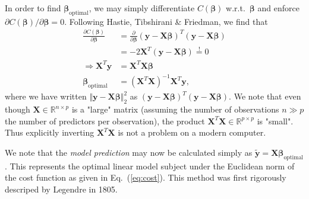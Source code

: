 \documentclass[a4paper, twocolumn]{article}
\newcommand{\eq} [1]{Eq.\ (\ref{eq:#1})}
\begin{document}
In order to find $\bm\beta_\text{optimal}$, we may simply differentiate $C(\bm\beta)$ w.r.t.\ $\bm\beta$ and enforce $\partial C(\bm\beta)/\partial \bm\beta = 0$. Following Hastie, Tibshirani \& Friedman\autocite{trevor2009elements}, we find that
\begin{align}
\frac{\partial C(\bm\beta)}{\partial \bm\beta} &= \frac{\partial}{\partial \bm\beta} (\mathbf{y}-\mathbf{X}\bm\beta)^T (\mathbf{y}-\mathbf{X}\bm\beta) \nonumber \\
%
&= -2\mathbf{X}^T(\mathbf{y}-\mathbf{X}\bm\beta) \stackrel{!}{=} 0 \nonumber \\
%
\Rightarrow \mathbf{X}^T\mathbf{y} &= \mathbf{X}^T\mathbf{X}\bm\beta \nonumber \\
%
\bm\beta_\text{optimal} &= \left(\mathbf{X}^T\mathbf{X}\right)^{-1}\mathbf{X}^T\mathbf{y},
\end{align}
where we have written $\Vert \mathbf{y}-\mathbf{X}\bm\beta\Vert_2^2$ as $(\mathbf{y}-\mathbf{X}\bm\beta)^T (\mathbf{y}-\mathbf{X}\bm\beta)$. We note that even though $\mathbf{X}\in \mathbb{R}^{n\times p}$ is a "large" matrix (assuming the number of observations $n\gg p$ the number of predictors per observation), the product $\mathbf{X}^T\mathbf{X}\in \mathbb{R}^{p\times p}$ is "small". Thus explicitly inverting $\mathbf{X}^T\mathbf{X}$ is not a problem on a modern computer. 

We note that the \textit{model prediction} may now be calculated simply as $\tilde{\mathbf{y}}=\mathbf{X}\bm\beta_\text{optimal}$. This represents the optimal linear model subject under the Euclidean norm of the cost function as given in \eq{cost}. This method was first rigorously descriped by Legendre in 1805\autocite{legendre1805nouvelles}.
\end{document}
